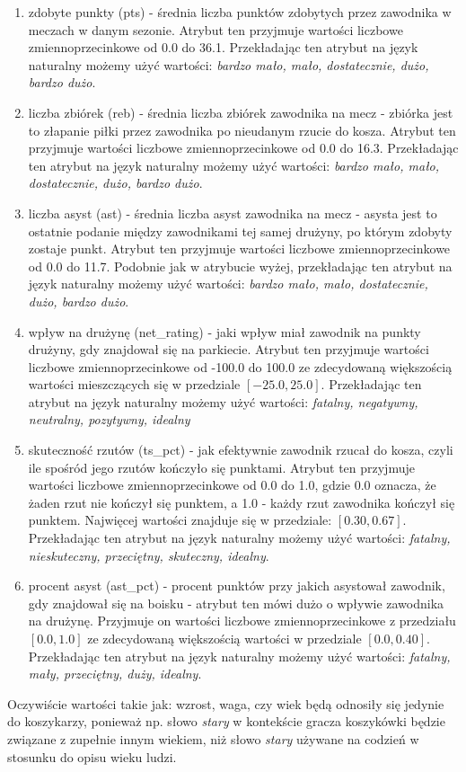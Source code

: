 \documentclass{classrep}
\begin{document}
\begin{itemize}
\begin{enumerate}
        \item zdobyte punkty (pts) - średnia liczba punktów zdobytych przez zawodnika w meczach w danym sezonie. Atrybut ten przyjmuje wartości liczbowe zmiennoprzecinkowe od 0.0 do 36.1. Przekładając ten atrybut na język naturalny możemy użyć wartości: \textit{bardzo mało, mało, dostatecznie, dużo, bardzo dużo}.
        \item liczba zbiórek (reb) - średnia liczba zbiórek zawodnika na mecz - zbiórka jest to złapanie piłki przez zawodnika po nieudanym rzucie do kosza. Atrybut ten przyjmuje wartości liczbowe zmiennoprzecinkowe od 0.0 do 16.3. Przekładając ten atrybut na język naturalny możemy użyć wartości: \textit{bardzo mało, mało, dostatecznie, dużo, bardzo dużo}.
        \item liczba asyst (ast) - średnia liczba asyst zawodnika na mecz - asysta jest to ostatnie podanie między zawodnikami tej samej drużyny, po którym zdobyty zostaje punkt. Atrybut ten przyjmuje wartości liczbowe zmiennoprzecinkowe od 0.0 do 11.7. Podobnie jak w atrybucie wyżej, przekładając ten atrybut na język naturalny możemy użyć wartości: \textit{bardzo mało, mało, dostatecznie, dużo, bardzo dużo}.
        \item wpływ na drużynę (net\_rating) - jaki wpływ miał zawodnik na punkty drużyny, gdy znajdował się na parkiecie. Atrybut ten przyjmuje wartości liczbowe zmiennoprzecinkowe od -100.0 do 100.0 ze zdecydowaną większością wartości mieszczących się w przedziale $[-25.0, 25.0]$. Przekładając ten atrybut na język naturalny możemy użyć wartości:
        \textit{fatalny, negatywny, neutralny, pozytywny, idealny}
        \item skuteczność rzutów (ts\_pct) - jak efektywnie zawodnik rzucał do kosza, czyli ile spośród jego rzutów kończyło się punktami. Atrybut ten przyjmuje wartości liczbowe zmiennoprzecinkowe od 0.0 do 1.0, gdzie 0.0 oznacza, że żaden rzut nie kończył się punktem, a 1.0 - każdy rzut zawodnika kończył się punktem. Najwięcej wartości znajduje się w przedziale: $[0.30, 0.67]$.  Przekładając ten atrybut na język naturalny możemy użyć wartości: \textit{fatalny, nieskuteczny, przeciętny, skuteczny, idealny}.
        \item procent asyst (ast\_pct) - procent punktów przy jakich asystował zawodnik, gdy znajdował się na boisku - atrybut ten mówi dużo o wpływie zawodnika na drużynę. Przyjmuje on wartości liczbowe zmiennoprzecinkowe z przedziału $[0.0, 1.0]$ ze zdecydowaną większością wartości w przedziale $[0.0, 0.40]$. Przekładając ten atrybut na język naturalny możemy użyć wartości: \textit{fatalny, mały, przeciętny, duży, idealny}.
    \end{enumerate}
\end{itemize}
Oczywiście wartości takie jak: wzrost, waga, czy wiek będą odnosiły się jedynie do koszykarzy, ponieważ np. słowo \textit{stary} w kontekście gracza koszykówki będzie związane z zupełnie innym wiekiem, niż słowo \textit{stary} używane na codzień w stosunku do opisu wieku ludzi. \\
\end{document}
